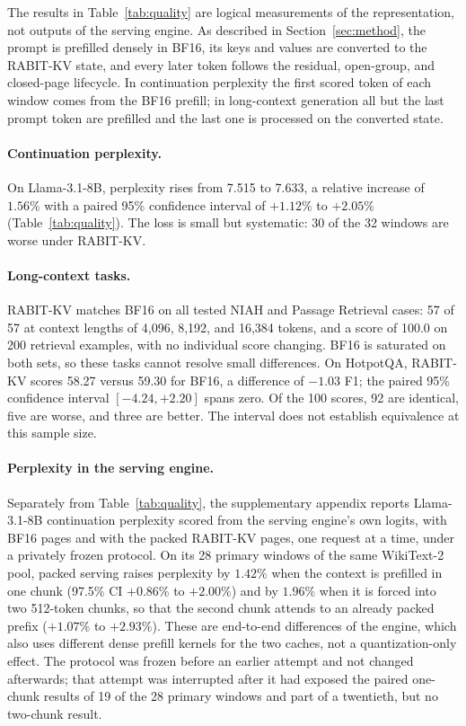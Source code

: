\documentclass{article}
\begin{document}
The results in Table~\ref{tab:quality} are logical measurements of the representation, not outputs of the serving engine.
As described in Section~\ref{sec:method}, the prompt is prefilled densely in BF16, its keys and values
are converted to the RABIT-KV state, and every later token follows the residual, open-group, and
closed-page lifecycle. In continuation perplexity the first scored token of each window comes from the
BF16 prefill; in long-context generation all but the last prompt token are prefilled and the last one
is processed on the converted state.

\paragraph{Continuation perplexity.}
On Llama-3.1-8B, perplexity rises from 7.515 to 7.633, a relative increase of $1.56\%$ with a paired
95\% confidence interval of $+1.12\%$ to $+2.05\%$ (Table~\ref{tab:quality}). The loss is small but
systematic: 30 of the 32 windows are worse under RABIT-KV.

\paragraph{Long-context tasks.}
RABIT-KV matches BF16 on all tested NIAH and Passage Retrieval cases: 57 of 57 at context lengths of
4,096, 8,192, and 16,384 tokens, and a score of 100.0 on 200 retrieval examples, with no individual
score changing. BF16 is saturated on both sets, so these tasks cannot resolve small differences. On
HotpotQA, RABIT-KV scores 58.27 versus 59.30 for BF16, a difference of $-1.03$ F1; the paired 95\%
confidence interval $[-4.24, +2.20]$ spans zero. Of the 100 scores, 92 are identical, five are worse,
and three are better. The interval does not establish equivalence at this sample size.

\paragraph{Perplexity in the serving engine.}
Separately from Table~\ref{tab:quality}, the supplementary appendix reports Llama-3.1-8B continuation
perplexity scored from the serving engine's own logits, with BF16 pages and with the packed RABIT-KV
pages, one request at a time, under a privately frozen protocol. On its 28 primary windows of the same
WikiText-2 pool, packed serving raises perplexity by $1.42\%$ when the context is prefilled in one chunk
(97.5\% CI $+0.86\%$ to $+2.00\%$) and by $1.96\%$ when it is forced into two 512-token chunks, so that
the second chunk attends to an already packed prefix ($+1.07\%$ to $+2.93\%$). These are end-to-end
differences of the engine, which also uses different dense prefill kernels for the two caches, not a
quantization-only effect. The protocol was frozen before an earlier attempt and not changed afterwards;
that attempt was interrupted after it had exposed the paired one-chunk results of 19 of the 28 primary
windows and part of a twentieth, but no two-chunk result.
\end{document}
